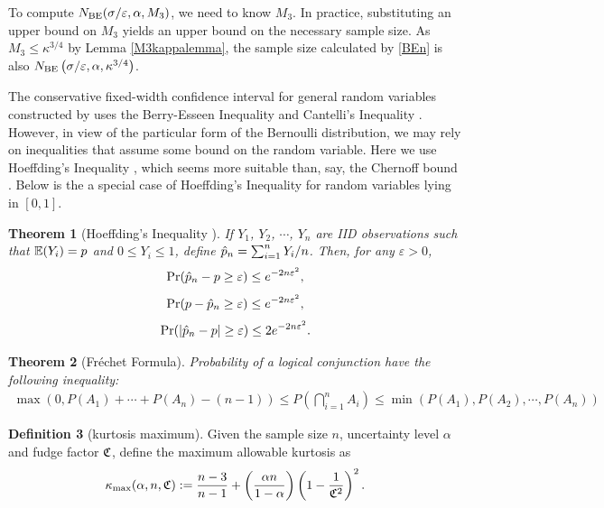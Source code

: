 \documentclass{iitthesis}
\newtheorem{theorem}{Theorem}[section]
\theoremstyle{definition}
\newtheorem{defn}[theorem]{Definition}
\begin{document}
To compute $N_{\text{BE}}(\sigma /\varepsilon,\alpha,M_3)$, we need to know
$M_3$. In practice, substituting an upper bound on $M_3$ yields an upper bound on the necessary sample size.
As $M_3 \leq \kappa^{3/4}$ by Lemma \ref{M3kappalemma}, the sample size calculated by \eqref{BEn} is also $N_{\text{BE}}\left(\sigma /\varepsilon,\alpha,\kappa^{3/4}\right) $.


The conservative fixed-width confidence interval for general random variables constructed by  \cite{HJLO12} uses the Berry-Esseen Inequality \cite[Section 4.1]{LB10} and Cantelli's Inequality \cite[Section 6.1]{LB10}. However, in view of the particular form of the Bernoulli distribution, we may rely on inequalities that assume some bound on the random variable.  Here we use Hoeffding's Inequality \cite{H63}, which seems more suitable than, say, the Chernoff bound \cite{chernoff52}.  Below is the a special case of Hoeffding's Inequality for random variables lying in $[0,1]$.
\begin{theorem}[Hoeffding's Inequality {\cite{H63}}] \label{hoeff}
If $Y_1$, $Y_2$, $\cdots$, $Y_n$ are IID observations such that $\mathbb{E}(Y_i)=p$ and $0 \leq Y_i \leq 1$, define $\hat{p}_n=\sum_{i=1}^n Y_i/n$. Then, for any $\varepsilon>0$, 
$$\Pr(\hat{p}_n-p \geq \varepsilon) \leq e^{-2n\varepsilon^2},$$
$$\Pr(p-\hat{p}_n \geq \varepsilon) \leq e^{-2n\varepsilon^2},$$
$$\Pr(\left \lvert \hat{p}_n-p \right \rvert \geq \varepsilon) \leq 2e^{-2n\varepsilon^2}.$$
\end{theorem}
 

\begin{theorem}[Fr\'{e}chet Formula] \cite{Frechet35}
Probability of a logical conjunction have the following inequality:
\begin{align}
\max(0, P(A_1) + \cdots +P(A_n)-(n -1)) \leq P\left(\bigcap_{i=1}^n A_i\right)\leq \min(P(A_1), P(A_2), \cdots, P(A_n))
\end{align}
\end{theorem}


\begin{defn}[kurtosis maximum]
Given the sample size $n$, uncertainty level $\alpha$ and fudge factor $\mathfrak{C}$, define the maximum allowable kurtosis as
\begin{equation}
\label{def:kmax}
\kappa_{\max}(\alpha, n,\mathfrak{C}):= \frac{n-3}{n-1} + \left(\frac{ \alpha n}{1-\alpha}\right) \left(1 - \frac{1}{\mathfrak{C}^2}\right)^2.
\end{equation}
\end{defn}
\end{document}
